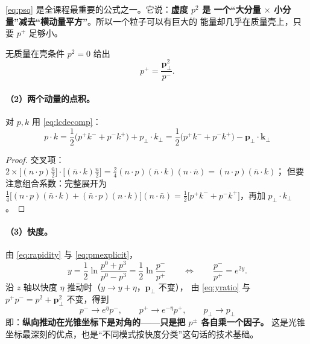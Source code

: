 \documentclass[UTF8,a4paper,11pt]{ctexart}
\theoremstyle{definition}
\theoremstyle{remark}
\theoremstyle{plain}
\newcommand{\pperp}{\bm{p}_\perp}
\newcommand{\kperp}{\bm{k}_\perp}
\begin{document}
\eqref{eq:psq} 是全课程最重要的公式之一。它说：\textbf{虚度 $p^2$ 是
一个“大分量 $\times$ 小分量”减去“横动量平方”}。所以一个粒子可以有巨大的
能量却几乎在质量壳上，只要 $p^+$ 足够小。

无质量在壳条件 $p^2=0$ 给出
\begin{equation}
  p^+=\frac{\pperp^2}{p^-} .
  \label{eq:onshell}
\end{equation}

\paragraph{（2）两个动量的点积。}对 $p,k$ 用 \eqref{eq:lcdecomp}：
\begin{equation}
  \boxed{\;
  p\cdot k=\frac12\big(p^+k^-+p^-k^+\big)+p_\perp\!\cdot\! k_\perp
  =\frac12\big(p^+k^-+p^-k^+\big)-\pperp\!\cdot\!\kperp \;}
  \label{eq:dotprod}
\end{equation}

\begin{proof}
交叉项：
$2\times\big[(n\cdot p)\frac{\bar n}{2}\big]\cdot\big[(\bar n\cdot k)\frac{n}{2}\big]
=\frac{2}{4}(n\cdot p)(\bar n\cdot k)(n\cdot\bar n)=(n\cdot p)(\bar n\cdot k)$；
但要注意组合系数：完整展开为
$\frac{1}{4}\big[(n\!\cdot\!p)(\bar n\!\cdot\!k)+(\bar n\!\cdot\!p)(n\!\cdot\!k)\big](n\!\cdot\!\bar n)
=\frac12\big[p^+k^-+p^-k^+\big]$，再加 $p_\perp\cdot k_\perp$。
\end{proof}

\paragraph{（3）快度。}由 \eqref{eq:rapidity} 与 \eqref{eq:pmexplicit}，
\begin{equation}
  y=\frac12\ln\frac{p^0+p^3}{p^0-p^3}=\frac12\ln\frac{p^-}{p^+}
  \qquad\Longleftrightarrow\qquad
  \frac{p^-}{p^+}=e^{2y} .
  \label{eq:yratio}
\end{equation}
沿 $z$ 轴以快度 $\eta$ 推动时（$y\to y+\eta$，$\pperp$ 不变），
由 \eqref{eq:yratio} 与 $p^+p^-=p^2+\pperp^2$ 不变，得到
\begin{equation}
  \boxed{\;p^-\to e^{\eta}p^-,\qquad p^+\to e^{-\eta}p^+,\qquad p_\perp\to p_\perp\;}
  \label{eq:boost}
\end{equation}
即：\textbf{纵向推动在光锥坐标下是对角的——只是把 $p^\pm$ 各自乘一个因子。}
这是光锥坐标最深刻的优点，也是“不同模式按快度分类”这句话的技术基础。
\end{document}
